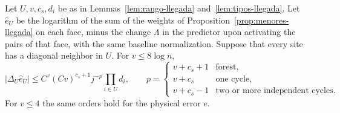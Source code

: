 \begin{proposicion}\label{prop:soportes-llegada}
Let \(U,v,c_s,d_i\) be as in Lemmas~\ref{lem:rango-llegada} and~\ref{lem:tipos-llegada}. Let \(\widehat
e_U\) be the logarithm of the sum of the weights of Proposition~\ref{prop:menores-llegada} on each face,
minus the change \(\Lambda\) in the predictor upon activating the pairs of that face, with the same
baseline normalization. Suppose that every site has a diagonal neighbor in \(U\). For \(v\le8\log n\),
\[
 |\Delta_U\widehat e_U|\le C^v(Cv)^{c_s+1}j^{-p}\prod_{i\in U}d_i,\qquad
 p=\begin{cases}v+c_s+1&\text{forest},\\v+c_s&\text{one cycle},\\
 v+c_s-1&\text{two or more independent cycles}.\end{cases}
\]
For \(v\le4\) the same orders hold for the physical error \(e\).
\end{proposicion}
